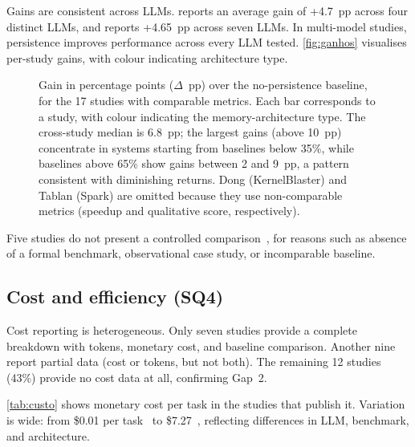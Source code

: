 Gains are consistent across LLMs.
\citet{shen2026structurally} reports an average gain of +4.7~pp across
four distinct LLMs, and \citet{wang2026memgovern} reports +4.65~pp
across seven LLMs.
In multi-model studies, persistence improves performance across every
LLM tested.
\autoref{fig:ganhos} visualises per-study gains, with colour indicating
architecture type.

\begin{figure}[!htbp]
  \centering
  
  \caption{Gain in percentage points ($\Delta$~pp) over the
    no-persistence baseline, for the 17 studies with comparable
    metrics.
    Each bar corresponds to a study, with colour indicating the
    memory-architecture type.
    The cross-study median is 6.8~pp; the largest gains (above
    10~pp) concentrate in systems starting from baselines below
    35\%, while baselines above 65\% show gains between 2 and
    9~pp, a pattern consistent with diminishing returns.
    Dong (KernelBlaster) and Tablan (Spark) are omitted because
    they use non-comparable metrics (speedup and qualitative
    score, respectively).}
  \label{fig:ganhos}
\end{figure}

Five studies do not present a controlled
comparison~\citep{bui2026opendev,vasilopoulos2026codified,qian2024iterative,hosain2025xolver,zhang2025accelopt},
for reasons such as absence of a formal benchmark, observational case
study, or incomparable baseline.

\FloatBarrier
\subsection{Cost and efficiency (SQ4)}
\label{sec:qs4}

Cost reporting is heterogeneous.
Only seven studies provide a complete breakdown with tokens, monetary
cost, and baseline comparison.
Another nine report partial data (cost or tokens, but not both).
The remaining 12 studies (43\%) provide no cost data at all, confirming
Gap~2.

\autoref{tab:custo} shows monetary cost per task in the studies that
publish it.
Variation is wide: from \$0.01 per
task~\citep{guo2026eet} to \$7.27~\citep{wang2026memgovern},
reflecting differences in LLM, benchmark, and architecture.

